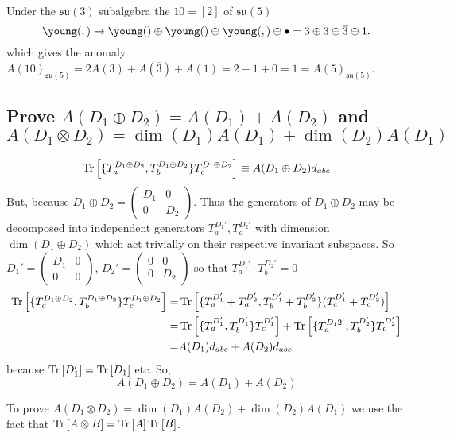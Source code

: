 \documentclass[main.tex]{subfiles}
\begin{document}
Under the $\mathfrak{su}(3)$ subalgebra the $10=[2]$ of $\mathfrak{su}(5)$ 
\begin{equation}
\young(\hfil,\hfil)\rightarrow\young(\hfil)\oplus\young(\hfil)\oplus\young(\hfil,\hfil)\oplus\bullet=3\oplus3\oplus\overline{3}\oplus1.
\end{equation} 
which gives the anomaly $A(10)_{\mathfrak{su}(5)}=2A(3)+A(\overline{3})+A(1)=2-1+0=1=A(5)_{\mathfrak{su}(5)}$. 

\subsection{Prove $A(D_1\oplus D_2)=A(D_1)+A(D_2)$ and $A(D_1\otimes D_2)=\dim{(D_1)}A(D_1)+\dim{(D_2)}A(D_1)$}
\begin{equation}
\operatorname{Tr}{\left[\{T_a^{D_1\oplus D_2},T_b^{D_1\oplus D_2}\}T_c^{D_1\oplus D_2}\right]}\equiv A(D_1\oplus D_2)d_{abc}
\end{equation}
But, because $D_1\oplus D_2=\begin{pmatrix}D_1&0\\0&D_2\end{pmatrix}$. Thus the generators of $D_1\oplus D_2$ may be decomposed into independent generators $T_a^{D_1'},T_a^{D_2'}$ with dimension $\dim{(D_1\oplus D_2)}$ which act trivially on their respective invariant subspaces. So $D_1'=\begin{pmatrix}D_1&0\\0&0\end{pmatrix}$, $D_2'=\begin{pmatrix}0&0\\0&D_2\end{pmatrix}$ so that $T_a^{D_1'}\cdot T_b^{D_2'}=0$
\begin{align}
\operatorname{Tr}{\left[\{T_a^{D_1\oplus D_2},T_b^{D_1\oplus D_2}\}T_c^{D_1\oplus D_2}\right]}=&\operatorname{Tr}{\left[\{T_a^{D_1'}+T_a^{D_2'},T_b^{D_1'}+T_b^{D_2'}\}(T_c^{D_1'}+T_c^{D_2'})\right]}\\
=&\operatorname{Tr}{\left[\{T_a^{D_1'},T_b^{D_1'}\}T_c^{D_1'}\right]}+\operatorname{Tr}{\left[\{T_a^{D_12'},T_b^{D_2'}\}T_c^{D_2'}\right]}\\
=& A(D_1)d_{abc}+A(D_2)d_{abc}
\end{align}
because $\operatorname{Tr}{[D_1']}=\operatorname{Tr}{[D_1]}$ etc. So, 
\begin{equation}
A(D_1\oplus D_2)=A(D_1)+A(D_2)
\end{equation}

To prove $A(D_1\otimes D_2)=\dim{(D_1)}A(D_2)+\dim{(D_2)}A(D_1)$ we use the fact that $\operatorname{Tr}{[A\otimes B]}=\operatorname{Tr}{[A]}\operatorname{Tr}{[B]}$.
\end{document}
